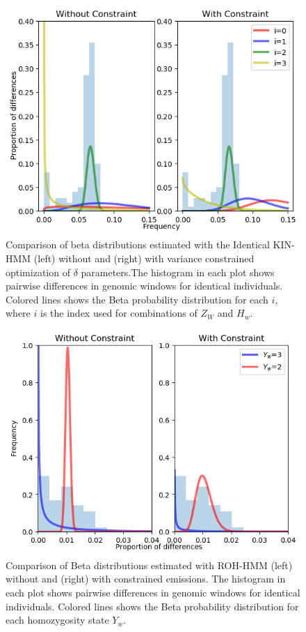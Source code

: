 \documentclass[12pt, letterpaper]{article}
\begin{document}
\begin{figure}[h!]
    \includegraphics[width=18cm]{supplementary_info/plots/contam0_inbred1_run57_coverage0.2_asc0_inputMode_hapProbs_fil0_pair0_15_relid_betaplot.png}
    \centering
    \caption{Comparison of beta distributions estimated with the Identical KIN-HMM (left) without and (right) with variance constrained optimization of $\delta$ parameters.The histogram in each plot shows pairwise differences in genomic windows for identical individuals. Colored lines shows the Beta probability distribution for each $i$, where $i$ is the index used for combinations of $Z_W$ and $H_w$.}
    \label{figS4:bndsbeta}
\end{figure}


\begin{figure}[h!]
    \includegraphics[width=18cm]{supplementary_info/plots/contam0_inbred1_run57_coverage0.2_asc0_inputMode_hapProbs_fil0_ind0_forced_roh.png}
     \centering
    \caption{Comparison of Beta distributions estimated with ROH-HMM (left) without and (right) with constrained emissions. The histogram in each plot shows pairwise differences in genomic windows for identical individuals. Colored lines shows the Beta probability distribution for each homozygosity state $Y_w$.}
    \label{figS5:ROHforced}
\end{figure}
\end{document}
